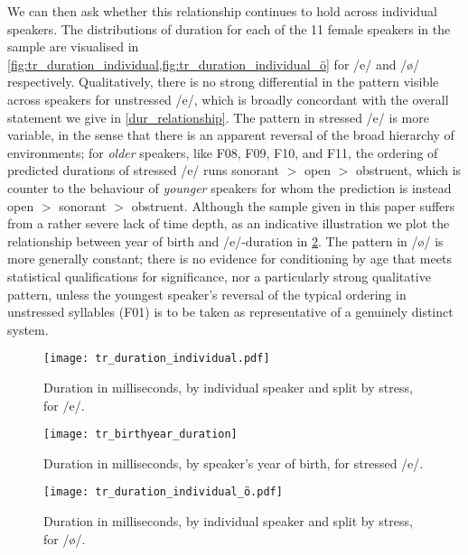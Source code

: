 We can then ask whether this relationship continues to hold across individual speakers. The distributions of duration for each of the 11 female speakers in the sample are visualised in \cref{fig:tr_duration_individual,fig:tr_duration_individual_ö} for /e/ and /ø/ respectively. Qualitatively, there is no strong differential in the pattern visible across speakers for unstressed /e/, which is broadly concordant with the overall statement we give in \cref{dur_relationship}. The pattern in stressed /e/ is more variable, in the sense that there is an apparent reversal of the broad hierarchy of environments; for \emph{older} speakers, like F08, F09, F10, and F11, the ordering of predicted durations of stressed /e/ runs sonorant $>$ open $>$ obstruent, which is counter to the behaviour of \emph{younger} speakers for whom the prediction is instead open $>$ sonorant $>$ obstruent. Although the sample given in this paper suffers from a rather severe lack of time depth, as an indicative illustration we plot the relationship between year of birth and /e/-duration in \cref{fig:tr_duration_e_birthyear}. The pattern in /ø/ is more generally constant; there is no evidence for conditioning by age that meets statistical qualifications for significance, nor a particularly strong qualitative pattern, unless the youngest speaker's reversal of the typical ordering in unstressed syllables (F01) is to be taken as representative of a genuinely distinct system.

\begin{figure}[H]
  \texttt{[image: tr\_duration\_individual.pdf]}
  \caption[Duration (ms) by individual speaker, for /e/.]{Duration in milliseconds, by individual speaker and split by stress, for /e/.}
  \label{fig:tr_duration_individual}
\end{figure}

\begin{figure}[H]
\centering
  \texttt{[image: tr\_birthyear\_duration]}
  \caption[Duration (ms) by year of birth of individual speakers, for stressed /e/.]{Duration in milliseconds, by speaker's year of birth, for stressed /e/.}
  \label{fig:tr_duration_e_birthyear}
\end{figure}

\begin{figure}[H]
  \texttt{[image: tr\_duration\_individual\_ö.pdf]}
  \caption[Duration (ms) by individual speaker, for /ø/.]{Duration in milliseconds, by individual speaker and split by stress, for /ø/.}
  \label{fig:tr_duration_individual_ö}
\end{figure}

